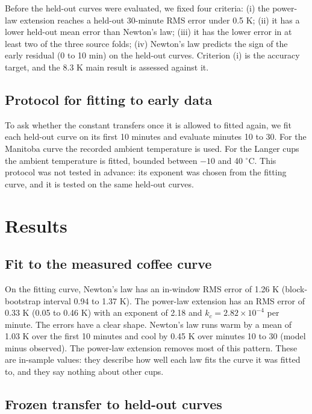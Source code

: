 \documentclass[11pt,letterpaper]{article}
\begin{document}
Before the held-out curves were evaluated, we fixed four criteria: (i) the power-law extension reaches a held-out 30-minute RMS error under 0.5 K; (ii) it has a lower held-out mean error than Newton's law; (iii) it has the lower error in at least two of the three source folds; (iv) Newton's law predicts the sign of the early residual (0 to 10 min) on the held-out curves. Criterion (i) is the accuracy target, and the 8.3 K main result is assessed against it.

\subsection{Protocol for fitting to early data}

To ask whether the constant transfers once it is allowed to fitted again, we fit each held-out curve on its first 10 minutes and evaluate minutes 10 to 30. For the Manitoba curve the recorded ambient temperature is used. For the Langer cups the ambient temperature is fitted, bounded between $-10$ and 40 $^\circ$C. This protocol was not tested in advance: its exponent was chosen from the fitting curve, and it is tested on the same held-out curves.

\section{Results}

\subsection{Fit to the measured coffee curve}\label{sec:fit}

On the fitting curve, Newton's law has an in-window RMS error of 1.26 K (block-bootstrap interval 0.94 to 1.37 K). The power-law extension has an RMS error of 0.33 K (0.05 to 0.46 K) with an exponent of 2.18 and $k_c = 2.82\times10^{-4}$ per minute. The errors have a clear shape. Newton's law runs warm by a mean of 1.03 K over the first 10 minutes and cool by 0.45 K over minutes 10 to 30 (model minus observed). The power-law extension removes most of this pattern. These are in-sample values: they describe how well each law fits the curve it was fitted to, and they say nothing about other cups.

\subsection{Frozen transfer to held-out curves}\label{sec:frozen}
\end{document}
